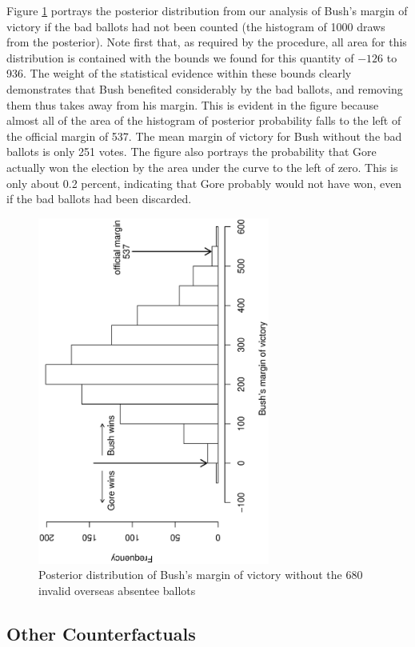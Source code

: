 \documentclass[11pt,titlepage]{article}
\begin{document}
Figure \ref{fg:margin} portrays the posterior distribution from our
analysis of Bush's margin of victory if the bad ballots had not been
counted (the histogram of 1000 draws from the posterior).  Note first
that, as required by the procedure, all area for this distribution is
contained with the bounds we found for this quantity of $-126$ to 936.
The weight of the statistical evidence within these bounds clearly
demonstrates that Bush benefited considerably by the bad ballots, and
removing them thus takes away from his margin.  This is evident in the
figure because almost all of the area of the histogram of posterior
probability falls to the left of the official margin of 537.  The mean
margin of victory for Bush without the bad ballots is only 251 votes.
The figure also portrays the probability that Gore actually won the
election by the area under the curve to the left of zero.  This is
only about 0.2 percent, indicating that Gore probably would not have
won, even if the bad ballots had been discarded.
\begin{figure}[t]
\begin{center}
\includegraphics[width=3in,height=4.5in,angle=-90]{margin}
\caption{Posterior distribution of Bush's margin of victory without the
  680 invalid overseas absentee ballots} \label{fg:margin}
\end{center} 
\end{figure}

\subsection{Other Counterfactuals}
\end{document}
